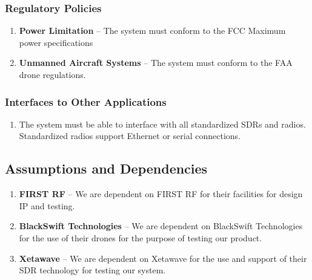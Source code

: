 \documentclass[ProductRequirements.tex]{subfiles}
\begin{document}
		\subsubsection{Regulatory Policies}
			\begin{enumerate}
				\item \textbf{Power Limitation} -- The system must conform to the FCC Maximum power specifications
				\item \textbf{Unmanned Aircraft Systems} -- The system must conform to the FAA drone regulations.
			\end{enumerate}
		\subsubsection{Interfaces to Other Applications}
			\begin{enumerate}
				\item The system must be able to interface with all standardized SDRs and radios.  Standardized radios support Ethernet or serial connections.
				
			\end{enumerate}

		
	\subsection{Assumptions and Dependencies}
		\begin{enumerate}
				\item \textbf{FIRST RF} -- We are dependent on FIRST RF for their facilities for design IP and testing.  
				\item \textbf{BlackSwift Technologies} -- We are dependent on BlackSwift Technologies for the use of their drones for the purpose of testing our product.  
				\item \textbf{Xetawave} -- We are dependent on Xetawave for the use and support of their SDR technology for testing our system.
		\end{enumerate}
\end{document}
